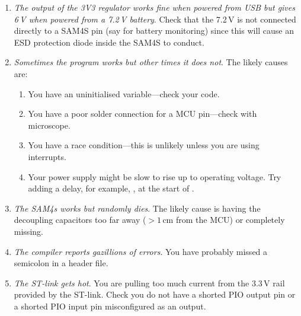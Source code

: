 \begin{enumerate}
\begin{enumerate}
  \item You are printing output using USB but a terminal program is
    not running.
  \end{enumerate}

\item
  \emph{The output of the 3V3 regulator works fine when powered from
    USB but gives 6\,V when powered from a 7.2\,V battery}. Check that
  the 7.2\,V is not connected directly to a SAM4S pin (say for battery
  monitoring) since this will cause an ESD protection diode inside the
  SAM4S to conduct.

\item \emph{Sometimes the program works but other times it does not}.
  The likely causes are:
  \begin{enumerate}
  \item You have an uninitialised variable---check your code.

  \item You have a poor solder connection for a MCU pin---check with
    microscope.

  \item You have a race condition---this is unlikely unless you are
    using interrupts.

  \item Your power supply might be slow to rise up to operating
    voltage.  Try adding a delay, for example, ,
    at the start of .
  \end{enumerate}

\item \emph{The SAM4s works but randomly dies}. The likely cause is
  having the decoupling capacitors too far away ($> 1$\,cm from the
  MCU) or completely missing.

\item \emph{The compiler reports gazillions of errors}.  You have
  probably missed a semicolon in a header file.

\item \emph{The ST-link gets hot}.  You are pulling too much current
  from the 3.3\,V rail provided by the ST-link.  Check you do not have
  a shorted PIO output pin or a shorted PIO input pin misconfigured as
  an output.

\end{enumerate}
